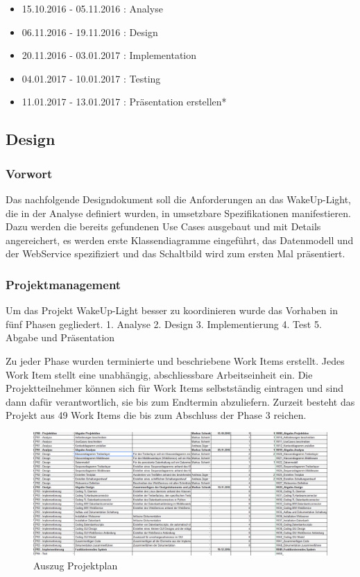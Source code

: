 \documentclass[]{article}
\providecommand{\tightlist}{%
  \setlength{\itemsep}{0pt}\setlength{\parskip}{0pt}}
\begin{document}
\begin{itemize}
\tightlist
\item
  15.10.2016 - 05.11.2016 : Analyse
\item
  06.11.2016 - 19.11.2016 : Design
\item
  20.11.2016 - 03.01.2017 : Implementation
\item
  04.01.2017 - 10.01.2017 : Testing
\item
  11.01.2017 - 13.01.2017 : Präsentation erstellen*
\end{itemize}

\subsection{Design}\label{design}

\subsubsection{Vorwort}\label{vorwort}

Das nachfolgende Designdokument soll die Anforderungen an das
WakeUp-Light, die in der Analyse definiert wurden, in umsetzbare
Spezifikationen manifestieren. Dazu werden die bereits gefundenen Use
Cases ausgebaut und mit Details angereichert, es werden erste
Klassendiagramme eingeführt, das Datenmodell und der WebService
spezifiziert und das Schaltbild wird zum ersten Mal präsentiert.

\subsubsection{Projektmanagement}\label{projektmanagement}

Um das Projekt WakeUp-Light besser zu koordinieren wurde das Vorhaben in
fünf Phasen gegliedert. 1. Analyse 2. Design 3. Implementierung 4. Test
5. Abgabe und Präsentation

Zu jeder Phase wurden terminierte und beschriebene Work Items erstellt.
Jedes Work Item stellt eine unabhängig, abschliessbare Arbeitseinheit
ein. Die Projektteilnehmer können sich für Work Items selbstständig
eintragen und sind dann dafür verantwortlich, sie bis zum Endtermin
abzuliefern. Zurzeit besteht das Projekt aus 49 Work Items die bis zum
Abschluss der Phase 3 reichen.

\begin{figure}[H]
\centering
\includegraphics{./WI29_Abgabe_Design_Projektplan.jpeg}
\caption{Auszug Projektplan}
\end{figure}
\end{document}
